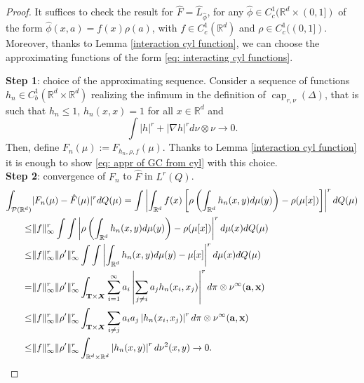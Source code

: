 \documentclass[10pt,leqno]{amsart}
\numberwithin{equation}{section}
\newcommand{\R}{\mathbb{R}}
\newcommand{\Q}{\mathbb{Q}}
\newcommand{\PP}{\mathcal{P}}
\renewcommand{\Q}{Q}
\begin{document}
\begin{proof}
    It suffices to check the result for $\hat{F} = \hat{L}_{\hat{\phi}}$, for any $\hat{\phi} \in C^1_c(\R^d \times (0,1])$ of the form $\hat{\phi}(x,a) = f(x) \rho(a)$, with $f\in C^1_c(\R^d)$ and $\rho \in C^1_c((0,1])$. Moreover, thanks to Lemma \ref{interaction cyl function}, we can choose the approximating functions of the form \eqref{eq: interacting cyl functions}.

    \textbf{Step 1}: choice of the approximating sequence. Consider a sequence of functions $h_n \in C_b^1(\R^d \times \R^d)$ realizing the infimum in the definition of $\operatorname{cap}_{r,\nu}(\Delta)$, that is such that $ h_n \leq 1$, $h_n(x,x) = 1$ for all $x\in \R^d$ and 
    \[\int |h|^r + |\nabla h|^r d\nu\otimes \nu \to 0.\]
    Then, define $F_n(\mu) := F_{h_n,\rho,f}(\mu)$. Thanks to Lemma \ref{interaction cyl function} it is enough to show \eqref{eq: appr of GC from cyl} with this choice.
    \\
    \textbf{Step 2}: convergence of $F_n$ to $\hat{F}$ in $L^r(\Q)$. 
    \begin{align*}
        \int_{\PP(\R^d)} & |F_n(\mu) - \hat{F}(\mu)|^rd\Q(\mu) 
        =
        \int \left| \int_{\R^d} f(x) \left[ 
        \rho\left(\int_{\R^d} h_n(x,y) d\mu(y)\right) - \rho(\mu[x]) \right] \right|^r d\Q(\mu)
        \\
        \leq & 
        \|f\|_\infty^r\int \int  \left|
        \rho\left(\int_{\R^d} h_n(x,y) d\mu(y)\right) - \rho(\mu[x])  \right|^rd\mu(x) d\Q(\mu)
        \\
        \leq &
        \|f\|_\infty^r \|\rho'\|_\infty^r \int \int  \left|\int_{\R^d} h_n(x,y) d\mu(y) - \mu[x]  \right|^rd\mu(x) d\Q(\mu)
        \\
        = &
        \|f\|_\infty^r \|\rho'\|_\infty^r\int_{\bold{T}\times \boldsymbol{X}} \sum_{i=1}^\infty a_i \left| 
        \sum_{j\neq i} a_j h_n(x_i,x_j) \right|^r d\pi\otimes \nu^\infty(\bold{a},\bold{x})
        \\
        \leq &
        \|f\|_\infty^r\|\rho'\|_\infty^r \int_{\bold{T}\times \boldsymbol{X}} \sum_{i\neq j} a_i a_j \left|h_n(x_i,x_j) \right|^r d\pi\otimes \nu^\infty(\bold{a},\bold{x})
        \\
        \leq &
        \|f\|_\infty^r \|\rho'\|_\infty^r \int_{\R^d\times\R^d} \left|h_n(x,y) \right|^r d \nu^2(x,y) \to 0.
    \end{align*}

\end{proof}
\end{document}
